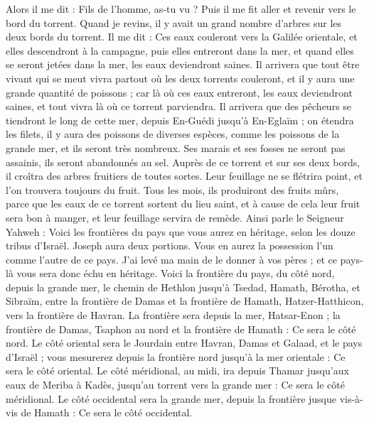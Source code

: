 \begin{multicols}{2}
Alors il me dit : Fils de l'homme, as-tu vu ? Puis il me fit aller et revenir vers le bord du torrent.
Quand je revins, il y avait un grand nombre d'arbres sur les deux bords du torrent.
Il me dit : Ces eaux couleront vers la Galilée orientale, et elles descendront à la campagne, puis elles entreront dans la mer, et quand elles se seront jetées dans la mer, les eaux deviendront saines.
Il arrivera que tout être vivant qui se meut vivra partout où les deux torrents couleront, et il y aura une grande quantité de poissons ; car là où ces eaux entreront, les eaux deviendront saines, et tout vivra là où ce torrent parviendra.
Il arrivera que des pêcheurs se tiendront le long de cette mer, depuis En-Guédi jusqu'à En-Eglaïm ; on étendra les filets, il y aura des poissons de diverses espèces, comme les poissons de la grande mer, et ils seront très nombreux.
Ses marais et ses fosses ne seront pas assainis, ils seront abandonnés au sel.
Auprès de ce torrent et sur ses deux bords, il croîtra des arbres fruitiers de toutes sortes. Leur feuillage ne se flétrira point, et l'on trouvera toujours du fruit. Tous les mois, ils produiront des fruits mûrs, parce que les eaux de ce torrent sortent du lieu saint, et à cause de cela leur fruit sera bon à manger, et leur feuillage servira de remède.
Ainsi parle le Seigneur Yahweh : Voici les frontières du pays que vous aurez en héritage, selon les douze tribus d'Israël. Joseph aura deux portions.
Vous en aurez la possession l'un comme l'autre de ce pays. J'ai levé ma main de le donner à vos pères ; et ce pays-là vous sera donc échu en héritage.
Voici la frontière du pays, du côté nord, depuis la grande mer, le chemin de Hethlon jusqu'à Tsedad,
Hamath, Bérotha, et Sibraïm, entre la frontière de Damas et la frontière de Hamath, Hatzer-Hatthicon, vers la frontière de Havran.
La frontière sera depuis la mer, Hatsar-Enon ; la frontière de Damas, Tsaphon au nord et la frontière de Hamath : Ce sera le côté nord.
Le côté oriental sera le Jourdain entre Havran, Damas et Galaad, et le pays d'Israël ; vous mesurerez depuis la frontière nord jusqu'à la mer orientale : Ce sera le côté oriental.
Le côté méridional, au midi, ira depuis Thamar jusqu'aux eaux de Meriba à Kadès, jusqu'au torrent vers la grande mer : Ce sera le côté méridional.
Le côté occidental sera la grande mer, depuis la frontière jusque vis-à-vis de Hamath : Ce sera le côté occidental.

\end{multicols}
